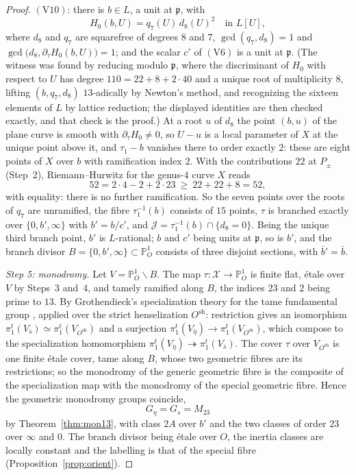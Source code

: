 \documentclass[11pt]{amsart}
\newcommand{\PP}{\mathbb{P}}
\newcommand{\Mtw}{M_{23}}
\newcommand{\pp}{\mathfrak p}
\newcommand{\Xs}{\mathscr X}
\theoremstyle{plain}
\theoremstyle{definition}
\begin{document}
\begin{proof}
$(\mathrm V10)$: there is $b\in L$, a unit at $\pp$, with
\[
  H_0(b,U)=q_7(U)\,d_8(U)^2\quad\text{in }L[U],
\]
where $d_8$ and $q_7$ are squarefree of degrees $8$ and $7$,
$\gcd(q_7,d_8)=1$ and $\gcd\bigl(d_8,\partial_\tau H_0(b,U)\bigr)=1$;
and the scalar $c'$ of $(\mathrm V6)$ is a unit at $\pp$.
(The witness was found by reducing modulo $\pp$, where the discriminant
of $H_0$ with respect to $U$ has degree $110=22+8+2\cdot40$ and a
unique root of multiplicity $8$, lifting $(b,q_7,d_8)$ $13$-adically by
Newton's method, and recognizing the sixteen elements of $L$ by lattice
reduction; the displayed identities are then checked exactly, and that
check is the proof.) At a root $u$ of $d_8$ the point $(b,u)$ of the
plane curve is smooth with $\partial_\tau H_0\ne0$, so $U-u$ is a local
parameter of $X$ at the unique point above it, and $\tau_1-b$ vanishes
there to order exactly $2$: these are eight points of $X$ over $b$
with ramification index $2$. With the contributions $22$ at $P_\pm$
(Step~2), Riemann--Hurwitz for the genus-$4$ curve $X$ reads
\[
  52=2\cdot4-2+2\cdot23\ \ge\ 22+22+8=52 ,
\]
with equality: there is no further ramification. So the seven points
over the roots of $q_7$ are unramified, the fibre $\tau_1^{-1}(b)$
consists of $15$ points, $\tau$ is branched exactly over
$\{0,b',\infty\}$ with $b'=b/c'$, and
$\mathcal J=\tau_1^{-1}(b)\cap\{d_8=0\}$. Being the unique third
branch point, $b'$ is $L$-rational; $b$ and $c'$ being units at $\pp$,
so is $b'$, and the branch divisor $B=\{0,b',\infty\}\subset\PP^1_O$
consists of three disjoint sections, with $\bar b'=\bar b$.

\emph{Step 5: monodromy.} Let $V=\PP^1_O\smallsetminus B$. The map
$\tau\colon\Xs\to\PP^1_O$ is finite flat, \'etale over $V$ by Steps~3
and~4, and tamely ramified along $B$, the indices $23$ and $2$ being
prime to $13$. By Grothendieck's specialization theory for the tame
fundamental group \cite[Exp.~XIII, 2.8--2.11]{SGA1}, applied over the
strict henselization $O^{\mathrm{sh}}$: restriction gives an
isomorphism $\pi_1^{t}(V_{\bar s})\simeq\pi_1^{t}(V_{O^{\mathrm{sh}}})$
and a surjection $\pi_1^{t}(V_{\bar\eta})\to\pi_1^{t}(V_{O^{\mathrm{sh}}})$,
which compose to the specialization homomorphism
$\pi_1^{t}(V_{\bar\eta})\twoheadrightarrow\pi_1^{t}(V_{\bar s})$. The
cover $\tau$ over $V_{O^{\mathrm{sh}}}$ is one finite \'etale cover,
tame along $B$, whose two geometric fibres are its restrictions; so
the monodromy of the generic geometric fibre is the composite of the
specialization map with the monodromy of the special geometric fibre.
Hence the geometric monodromy groups coincide,
\[
  G_\eta=G_s=\Mtw
\]
by Theorem~\ref{thm:mon13}, with class $2A$ over $b'$ and the two
classes of order $23$ over $\infty$ and $0$. The branch divisor being
\'etale over $O$, the inertia classes are locally constant
\cite{Fulton,RomagnyWewers} and the labelling is that of the special
fibre (Proposition~\ref{prop:orient}).


\end{proof}
\end{document}
